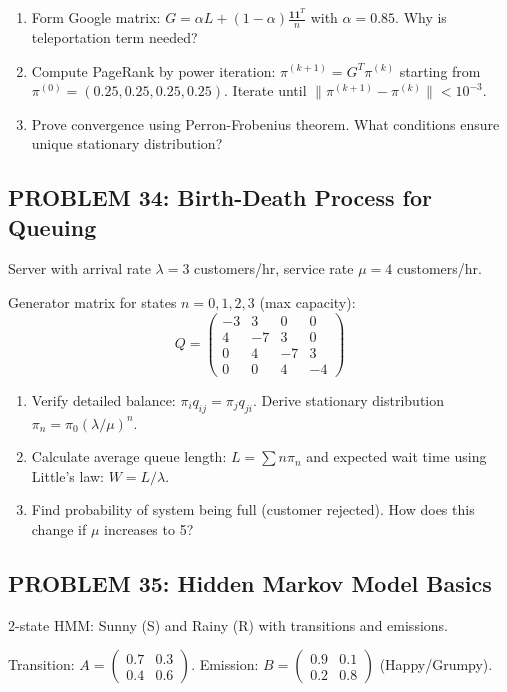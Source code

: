 \documentclass[12pt]{article}
\begin{document}
\begin{enumerate}
\item[(a)] Form Google matrix: \(G = \alpha L + (1-\alpha)\frac{\mathbf{1}\mathbf{1}^T}{n}\) with \(\alpha = 0.85\). Why is teleportation term needed?
\item[(b)] Compute PageRank by power iteration: \(\pi^{(k+1)} = G^T\pi^{(k)}\) starting from \(\pi^{(0)} = (0.25, 0.25, 0.25, 0.25)\). Iterate until \(\|\pi^{(k+1)} - \pi^{(k)}\| < 10^{-3}\).
\item[(c)] Prove convergence using Perron-Frobenius theorem. What conditions ensure unique stationary distribution?
\end{enumerate}

\subsection*{PROBLEM 34: Birth-Death Process for Queuing}

Server with arrival rate \(\lambda = 3\) customers/hr, service rate \(\mu = 4\) customers/hr.

Generator matrix for states \(n = 0,1,2,3\) (max capacity):
\[
Q = \begin{pmatrix}
-3 & 3 & 0 & 0 \\
4 & -7 & 3 & 0 \\
0 & 4 & -7 & 3 \\
0 & 0 & 4 & -4
\end{pmatrix}
\]

\begin{enumerate}
\item[(a)] Verify detailed balance: \(\pi_i q_{ij} = \pi_j q_{ji}\). Derive stationary distribution \(\pi_n = \pi_0(\lambda/\mu)^n\).
\item[(b)] Calculate average queue length: \(L = \sum n\pi_n\) and expected wait time using Little's law: \(W = L/\lambda\).
\item[(c)] Find probability of system being full (customer rejected). How does this change if \(\mu\) increases to 5?
\end{enumerate}

\subsection*{PROBLEM 35: Hidden Markov Model Basics}

2-state HMM: Sunny (S) and Rainy (R) with transitions and emissions.

Transition: \(A = \begin{pmatrix} 0.7 & 0.3 \\ 0.4 & 0.6 \end{pmatrix}\). Emission: \(B = \begin{pmatrix} 0.9 & 0.1 \\ 0.2 & 0.8 \end{pmatrix}\) (Happy/Grumpy).
\end{document}
